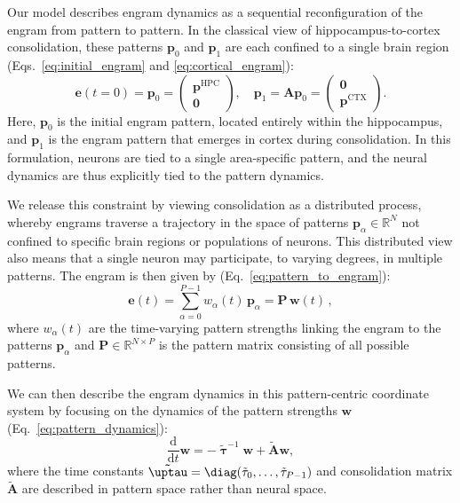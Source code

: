 Our model describes engram dynamics as a sequential reconfiguration of the engram from pattern to pattern. In the classical view of hippocampus-to-cortex consolidation, these patterns $\mathbf{p}_0$ and $\mathbf{p}_1$ are each confined to a single brain region (Eqs.~\ref{eq:initial_engram} and \ref{eq:cortical_engram}):
%
\begin{equation}
  \mathbf{e}(t=0) = \mathbf{p}_0 = \begin{pmatrix}
    \mathbf{p}^{\mathrm{HPC}} \\[1ex]
    \mathbf{0}
  \end{pmatrix}, \quad %
  \mathbf{p}_1 = \mathbf{A} \mathbf{p}_0 = \begin{pmatrix}
    \mathbf{0} \\[1ex]
    \mathbf{p}^{\mathrm{CTX}}
  \end{pmatrix}.
\end{equation}
%
Here, $\mathbf{p}_0$ is the initial engram pattern, located entirely within the hippocampus, and $\mathbf{p}_1$ is the engram pattern that emerges in cortex during consolidation. In this formulation, neurons are tied to a single area-specific pattern, and the neural dynamics are thus explicitly tied to the pattern dynamics.

We release this constraint by viewing consolidation as a distributed process, whereby engrams traverse a trajectory in the space of patterns $\mathbf{p}_\alpha \in \mathbb{R}^N$ not confined to specific brain regions or populations of neurons. This distributed view also means that a single neuron may participate, to varying degrees, in multiple patterns. The engram is then given by (Eq.~\ref{eq:pattern_to_engram}):
%
\begin{equation}
\mathbf{e}(t) = \sum_{\alpha=0}^{P-1} w_{\alpha}(t) \, \mathbf{p}_{\alpha} = \mathbf{P} \, \mathbf{w}(t)\,,
\end{equation}
%
where $w_{\alpha}(t)$ are the time-varying pattern strengths linking the engram to the patterns $\mathbf{p}_\alpha$ and $\mathbf{P}\in \mathbb{R}^{N \times P}$ is the pattern matrix consisting of all possible patterns.  

We can then describe the engram dynamics in this pattern-centric coordinate system by focusing on the dynamics of the pattern strengths $\mathbf{w}$ (Eq.~\ref{eq:pattern_dynamics}):
%
\begin{equation}
\frac{\mathrm{d}}{\mathrm{d}t} \mathbf{w} = -\boldsymbol{\tilde{\uptau}}^{-1} \mathbf{w} + \tilde{\mathbf{A}} \mathbf{w},
\end{equation}
%
where the time constants $\boldsymbol{\tilde{\uptau}} = \diag(\tilde{\tau}_0,\ldots,\tilde{\tau}_{P-1})$ and consolidation matrix $\tilde{\mathbf{A}}$ are described in pattern space rather than neural space.

